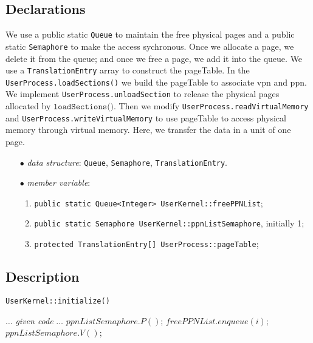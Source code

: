 \documentclass{article}
\begin{document}
\begin{spacing}{1.1}
\subsection{Declarations}
We use a public static \texttt{Queue} to maintain the free physical pages and a public
static \texttt{Semaphore} to make the access sychronous. Once we allocate a
page, we delete it from the queue; and once we free a page, we add it
into the queue. We use a 
\texttt{TranslationEntry} array to construct the pageTable. In the 
\texttt{UserProcess.loadSections()} we build the pageTable to associate vpn and ppn.
We implement \texttt{UserProcess.unloadSection} to release the physical pages
allocated by $\texttt{loadSections()}$.
Then we modify \texttt{UserProcess.readVirtualMemory} and 
\texttt{UserProcess.writeVirtualMemory} to use pageTable to access physical
memory through virtual memory. Here, we transfer the data in a unit of one page.
\begin{enumerate}
  \item[$\bullet$] \textit{data structure}: \texttt{Queue}, \texttt{Semaphore},
    \texttt{TranslationEntry}.
  \item[$\bullet$] \textit{member variable}:
    \begin{enumerate}
      \item \texttt{public static Queue<Integer> UserKernel::freePPNList};
      \item \texttt{public static Semaphore UserKernel::ppnListSemaphore}, initially 1;
      \item \texttt{protected TranslationEntry[] UserProcess::pageTable};
      \end{enumerate}
\end{enumerate}

\subsection{Description}
\begin{algorithm}
  \caption{\texttt{UserKernel::initialize()}}
  \begin{algorithmic}[1]
    \STATE $\dots$ \textit{given code} $\dots$
    \STATE $ppnListSemaphore.P()$;
    \STATE $freePPNList.enqueue(i)$;
    \ENDFOR
    \STATE $ppnListSemaphore.V()$;
  \end{algorithmic}
\end{algorithm}


\end{spacing}
\end{document}
